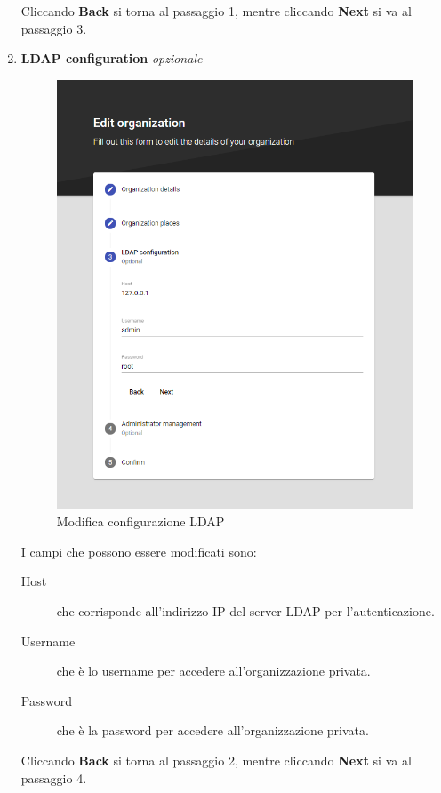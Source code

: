 \documentclass[../manuale-utente.tex]{subfiles}
\begin{document}
\begin{enumerate}
    Cliccando \textbf{Back} si torna al passaggio 1, mentre cliccando \textbf{Next} si va al passaggio 3.

    \item \textbf{LDAP configuration}-\textit{opzionale}
    
    \begin{figure}[H]
        \centering
        \includegraphics[width=120mm]{img/web-app/edit-organization/3-configurazione-ldap.png}
        \caption{Modifica configurazione LDAP}%
        \label{fig:web_app_modifica_configurazione_ldap}
    \end{figure}

    I campi che possono essere modificati sono:
    \begin{description}
        \item[Host] che corrisponde all'indirizzo IP del server LDAP per l'autenticazione.
        \item[Username] che è lo username per accedere all'organizzazione privata. 
        \item[Password] che è la password per accedere all'organizzazione privata.
    \end{description}

    Cliccando \textbf{Back} si torna al passaggio 2, mentre cliccando \textbf{Next} si va al passaggio 4.


\end{enumerate}
\end{document}
